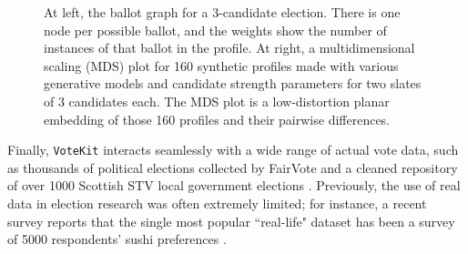 \documentclass{article}
\newcommand{\VK}{{\tt VoteKit}\xspace}
\begin{document}
\begin{figure}[bht!]
 \caption{At left, the ballot graph for a 3-candidate election.  There is one node per possible ballot, and the weights show the number of instances of that ballot in the profile.  At right, a multidimensional scaling (MDS) plot for 160 synthetic profiles made with various generative models and candidate strength parameters for two slates of 3 candidates each.  
The MDS plot is a low-distortion planar embedding of those 160 profiles and their pairwise differences.}
 \label{fig: votekit visualization}
\end{figure}

Finally, \VK interacts seamlessly with a wide range of actual vote data, such as thousands of political elections collected by FairVote and a cleaned repository of over 1000 Scottish STV local government elections \cite{RCV-Cruncher,Scot-Elex}.  Previously, the use of real data in election research was often extremely limited; for instance, a recent survey reports that the single most popular ``real-life" dataset has been a survey of 5000 respondents' sushi preferences \cite{GuideExperiments}.
\end{document}
